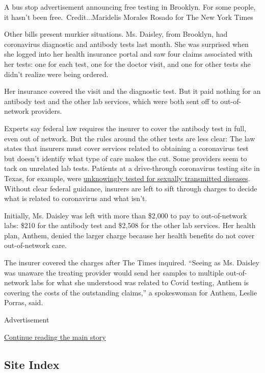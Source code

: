 A bus stop advertisement announcing free testing in Brooklyn. For some
people, it hasn't been free.~Credit...Maridelis Morales Rosado for The
New York Times

Other bills present murkier situations. Ms. Daisley, from Brooklyn, had
coronavirus diagnostic and antibody tests last month. She was surprised
when she logged into her health insurance portal and saw four claims
associated with her tests: one for each test, one for the doctor visit,
and one for other tests she didn't realize were being ordered.

Her insurance covered the visit and the diagnostic test. But it paid
nothing for an antibody test and the other lab services, which were both
sent off to out-of-network providers.

Experts say federal law requires the insurer to cover the antibody test
in full, even out of network. But the rules around the other tests are
less clear: The law states that insurers must cover services related to
obtaining a coronavirus test but doesn't identify what type of care
makes the cut. Some providers seem to tack on unrelated lab tests.
Patients at a drive-through coronavirus testing site in Texas, for
example, were
\href{https://www.nytimes3xbfgragh.onion/2020/06/29/upshot/coronavirus-tests-unpredictable-prices.html}{unknowingly
tested for sexually transmitted diseases}. Without clear federal
guidance, insurers are left to sift through charges to decide what is
related to coronavirus and what isn't.

Initially, Ms. Daisley was left with more than \$2,000 to pay to
out-of-network labs: \$210 for the antibody test and \$2,508 for the
other lab services. Her health plan, Anthem, denied the larger charge
because her health benefits do not cover out-of-network care.

The insurer covered the charges after The Times inquired. ``Seeing as
Ms. Daisley was unaware the treating provider would send her samples to
multiple out-of-network labs for what she understood was related to
Covid testing, Anthem is covering the costs of the outstanding claims,''
a spokeswoman for Anthem, Leslie Porras, said.

Advertisement

\protect\hyperlink{after-bottom}{Continue reading the main story}

\hypertarget{site-index}{%
\subsection{Site Index}\label{site-index}}

